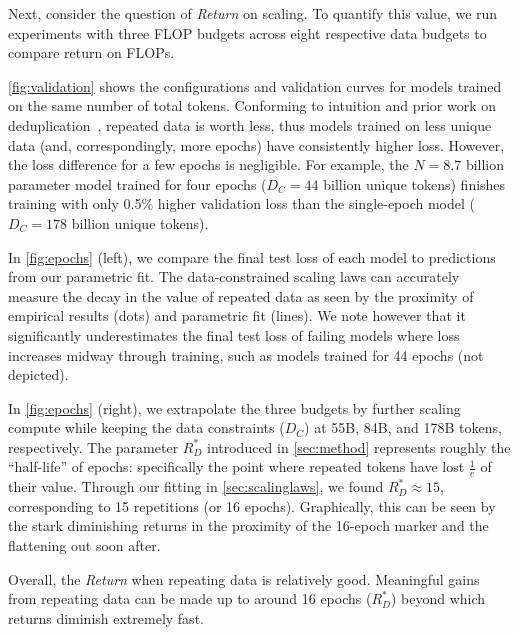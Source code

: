\documentclass{article}
\begin{document}
Next, consider the question of \textit{Return} on scaling. To quantify this value, we run experiments with three FLOP budgets across eight respective data budgets to compare return on FLOPs. 

\autoref{fig:validation} shows the configurations and validation curves for models trained on the same number of total tokens. Conforming to intuition and prior work on deduplication~\cite{deduplicatinglee2021}, repeated data is worth less, thus models trained on less unique data (and, correspondingly, more epochs) have consistently higher loss. However, the loss difference for a few epochs is negligible. For example, the $N=8.7$ billion parameter model trained for four epochs ($D_C=44$ billion unique tokens) finishes training with only 0.5\% higher validation loss than the single-epoch model ($D_C=178$ billion unique tokens).

In \autoref{fig:epochs} (left), we compare the final test loss of each model to predictions from our parametric fit. The data-constrained scaling laws can accurately measure the decay in the value of repeated data as seen by the proximity of empirical results (dots) and parametric fit (lines). We note however that it significantly underestimates the final test loss of failing models where loss increases midway through training, such as models trained for 44 epochs (not depicted). 

In \autoref{fig:epochs} (right), we extrapolate the three budgets by further scaling compute while keeping the data constraints ($D_C$) at 55B, 84B, and 178B tokens, respectively. The parameter $R_D^*$ introduced in \autoref{sec:method} represents roughly the  ``half-life'' of epochs: specifically the point where repeated tokens have lost  $\tfrac{1}{e}$ of their value. Through our fitting in \autoref{sec:scalinglaws}, we found $R_D^* \approx 15$, corresponding to 15 repetitions (or 16 epochs). Graphically, this can be seen by the stark diminishing returns in the proximity of the 16-epoch marker and the flattening out soon after.

Overall, the \emph{Return} when repeating data is relatively good. Meaningful gains from repeating data can be made up to around 16 epochs ($R_D^*$) beyond which returns diminish extremely fast.


\end{document}
